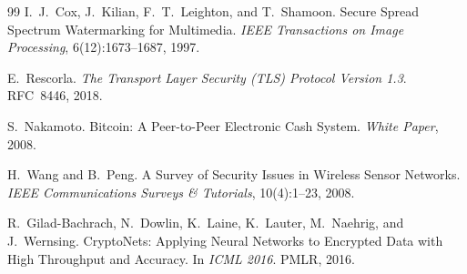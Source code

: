 ﻿\documentclass[a4paper,12pt]{scrreprt}
\theoremstyle{definition}
\begin{document}
\begin{thebibliography}{99}
I.\ J.\ Cox, J.\ Kilian, F.\ T.\ Leighton, and T.\ Shamoon. Secure Spread Spectrum Watermarking for Multimedia. \textit{IEEE Transactions on Image Processing}, 6(12):1673--1687, 1997.

E.\ Rescorla. \textit{The Transport Layer Security (TLS) Protocol Version 1.3}. RFC~8446, 2018.

S.\ Nakamoto. Bitcoin: A Peer-to-Peer Electronic Cash System. \textit{White Paper}, 2008.

H.\ Wang and B.\ Peng. A Survey of Security Issues in Wireless Sensor Networks. \textit{IEEE Communications Surveys \& Tutorials}, 10(4):1--23, 2008.

R.\ Gilad-Bachrach, N.\ Dowlin, K.\ Laine, K.\ Lauter, M.\ Naehrig, and J.\ Wernsing. CryptoNets: Applying Neural Networks to Encrypted Data with High Throughput and Accuracy. In \textit{ICML 2016}. PMLR, 2016.

\end{thebibliography}
\end{document}
